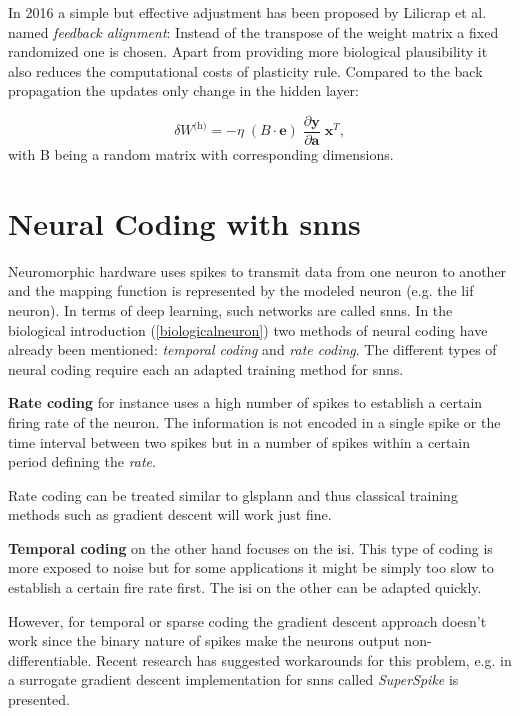 In 2016 a simple but effective adjustment has been proposed by Lilicrap et al. named \textit{feedback alignment}: Instead of the transpose of the weight matrix a fixed randomized one is chosen. Apart from providing more biological plausibility it also reduces the computational costs of plasticity rule. Compared to the back propagation the updates only change in the hidden layer:

\begin{equation}
\delta W^{\text{(h)}} = - \eta \;
(B \cdot \mathbf{e}) \;
\frac{\partial \mathbf{y}}{\partial \mathbf{a}} \;
\mathbf{x}^T,
\end{equation}
with B being a random matrix with corresponding dimensions.


\section{Neural Coding with \glspl{snn}}
Neuromorphic hardware uses spikes to transmit data from one neuron to another and the mapping function is represented by the modeled neuron (e.g. the \gls{lif} neuron). In terms of deep learning, such networks are called \glspl{snn}. In the biological introduction (\cref{biologicalneuron}) two methods of neural coding have already been mentioned: \emph{temporal coding} and \emph{rate coding}. The different types of neural coding require each an adapted training method for \glspl{snn}.

\textbf{Rate coding} for instance uses a high number of spikes to establish a certain firing rate of the neuron. The information is not encoded in a single spike or the time interval between two spikes but in a number of spikes within a certain period defining the \textit{rate}. 

Rate coding can be treated similar to glspl{ann} and thus classical training methods such as gradient descent will work just fine. 

\textbf{Temporal coding} on the other hand focuses on the \gls{isi}. This type of coding is more exposed to noise but for some applications it might be simply too slow to establish a certain fire rate first. The \gls{isi} on the other can be adapted quickly. 

However, for temporal or sparse coding the gradient descent approach doesn't work since the binary nature of spikes make the neurons output non-differentiable. Recent research has suggested workarounds for this problem, e.g. in \cite{zenke2018superspike} a surrogate gradient descent implementation for \glspl{snn} called \emph{SuperSpike} is presented.


